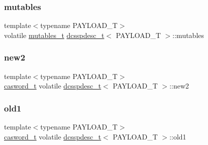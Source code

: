 \mbox{\label{classdcsspdesc__t_a0c377eb0bb0ca80e67bfdb958bc154a3}} 
\subsubsection{\texorpdfstring{mutables}{mutables}}
{\footnotesize\ttfamily template$<$typename P\+A\+Y\+L\+O\+A\+D\+\_\+T$>$ \\
volatile \hyperlink{descriptors_8h_a8a5af2749482b19d7515054489efca22}{mutables\+\_\+t} \hyperlink{classdcsspdesc__t}{dcsspdesc\+\_\+t}$<$ P\+A\+Y\+L\+O\+A\+D\+\_\+T $>$\+::mutables}

\mbox{\label{classdcsspdesc__t_a26e12bf581a9cf3b5007d6affed2d944}} 
\subsubsection{\texorpdfstring{new2}{new2}}
{\footnotesize\ttfamily template$<$typename P\+A\+Y\+L\+O\+A\+D\+\_\+T$>$ \\
\hyperlink{rq__unsafe_8h_ad45142aaf2ff20a036dc6242b8483e9c}{casword\+\_\+t} volatile \hyperlink{classdcsspdesc__t}{dcsspdesc\+\_\+t}$<$ P\+A\+Y\+L\+O\+A\+D\+\_\+T $>$\+::new2}

\mbox{\label{classdcsspdesc__t_ae4e128e33e5819e8df288c149ad6a9c2}} 
\subsubsection{\texorpdfstring{old1}{old1}}
{\footnotesize\ttfamily template$<$typename P\+A\+Y\+L\+O\+A\+D\+\_\+T$>$ \\
\hyperlink{rq__unsafe_8h_ad45142aaf2ff20a036dc6242b8483e9c}{casword\+\_\+t} volatile \hyperlink{classdcsspdesc__t}{dcsspdesc\+\_\+t}$<$ P\+A\+Y\+L\+O\+A\+D\+\_\+T $>$\+::old1}

\mbox{\label{classdcsspdesc__t_a898e3c1a51fff0a73c484b1f3ed2fc49}} 
